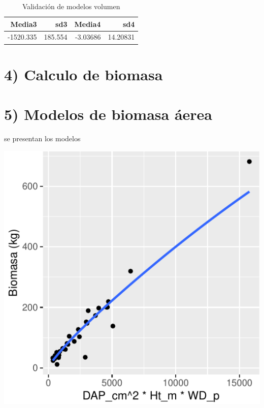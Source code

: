 \documentclass[9pt,onecolumn,twoside,]{pinp}
\begin{document}
\begin{table}

\caption{\label{tab:unnamed-chunk-11}Validación de modelos volumen}
\centering
\begin{tabular}[t]{r|r|r|r}
\hline
Media3 & sd3 & Media4 & sd4\\
\hline
-1520.335 & 185.554 & -3.03686 & 14.20831\\
\hline
\end{tabular}
\end{table}

\hypertarget{calculo-de-biomasa}{%
\section{4) Calculo de biomasa}\label{calculo-de-biomasa}}

\hypertarget{modelos-de-biomasa-uxe1erea}{%
\section{5) Modelos de biomasa
áerea}\label{modelos-de-biomasa-uxe1erea}}

se presentan los modelos

\begin{center}\includegraphics{David_Londono_Lopera_Cristian_Ganan_parcial3_files/figure-latex/unnamed-chunk-23-1} \end{center}
\end{document}
